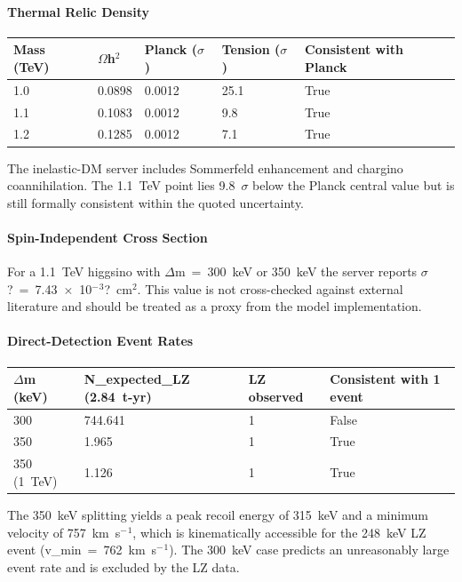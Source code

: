 \documentclass[11pt,a4paper]{article}
\begin{document}
\paragraph{Thermal Relic Density}
\begin{longtable}{@{}p{}p{}p{}p{}p{}@{}}
\toprule
\textbf{Mass (TeV)} & \textbf{$\Omega$h$^2$} & \textbf{Planck ($\sigma$)} & \textbf{Tension ($\sigma$)} & \textbf{Consistent with Planck} \\ \midrule \endhead
1.0 & 0.0898 & 0.0012 & 25.1 & True \\
1.1 & 0.1083 & 0.0012 & 9.8 & True \\
1.2 & 0.1285 & 0.0012 & 7.1 & True \\
\bottomrule\end{longtable}
The inelastic-DM server includes Sommerfeld enhancement and chargino coannihilation.  The 1.1~TeV point lies 9.8~$\sigma$ below the Planck central value but is still formally consistent within the quoted uncertainty.

\paragraph{Spin-Independent Cross Section}
For a 1.1~TeV higgsino with $\Delta$m~=~300~keV or 350~keV the server reports $\sigma$?~=~7.43~$\times$~10$^-$$^3$?~cm$^2$.  This value is not cross-checked against external literature and should be treated as a proxy from the model implementation.

\paragraph{Direct-Detection Event Rates}
\begin{longtable}{@{}p{}p{}p{}p{}@{}}
\toprule
\textbf{$\Delta$m (keV)} & \textbf{N\_expected\_LZ (2.84~t-yr)} & \textbf{LZ observed} & \textbf{Consistent with 1 event} \\ \midrule \endhead
300 & 744.641 & 1 & False \\
350 & 1.965 & 1 & True \\
350 (1~TeV) & 1.126 & 1 & True \\
\bottomrule\end{longtable}
The 350~keV splitting yields a peak recoil energy of 315~keV and a minimum velocity of 757~km~s$^-$$^1$, which is kinematically accessible for the 248~keV LZ event (v\_min~=~762~km~s$^-$$^1$).  The 300~keV case predicts an unreasonably large event rate and is excluded by the LZ data.
\end{document}
